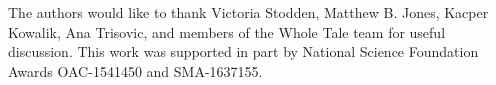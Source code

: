 
\begin{acks}
The authors would like to thank Victoria Stodden, Matthew B. Jones,
Kacper Kowalik, Ana Trisovic, and members of the Whole Tale team for useful discussion.
This work was supported in part by National Science Foundation Awards
OAC-1541450 and SMA-1637155.
\end{acks}

